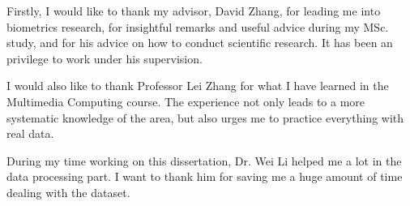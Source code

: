 
Firstly, I would like to thank my advisor, David Zhang, for leading me into biometrics research, for insightful remarks and useful advice during my MSc. study, and for his advice on how to conduct scientific research. It has been an privilege to work under his supervision.

I would also like to thank Professor Lei Zhang for what I have learned in the Multimedia Computing course. The experience not only leads to a more systematic knowledge of the area, but also urges me to practice everything with real data.

During my time working on this dissertation, Dr. Wei Li helped me a lot in the data processing part. I want to thank him for saving me a huge amount of time dealing with the dataset.